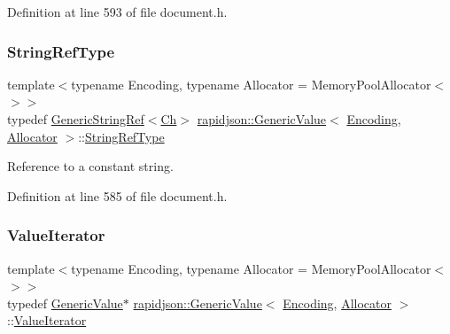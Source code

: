 Definition at line 593 of file document.\+h.

\mbox{\label{classrapidjson_1_1_generic_value_a559eb9cea54364a35518b02f6d74f379}} 
\subsubsection{\texorpdfstring{StringRefType}{StringRefType}}
{\footnotesize\ttfamily template$<$typename Encoding, typename Allocator = Memory\+Pool\+Allocator$<$$>$$>$ \\
typedef \mbox{\hyperlink{structrapidjson_1_1_generic_string_ref}{Generic\+String\+Ref}}$<$\mbox{\hyperlink{classrapidjson_1_1_generic_value_adcdbc7fa85a9a41b78966d7e0dcc2ac4}{Ch}}$>$ \mbox{\hyperlink{classrapidjson_1_1_generic_value}{rapidjson\+::\+Generic\+Value}}$<$ \mbox{\hyperlink{classrapidjson_1_1_encoding}{Encoding}}, \mbox{\hyperlink{classrapidjson_1_1_allocator}{Allocator}} $>$\+::\mbox{\hyperlink{classrapidjson_1_1_generic_value_a559eb9cea54364a35518b02f6d74f379}{String\+Ref\+Type}}}



Reference to a constant string. 



Definition at line 585 of file document.\+h.

\mbox{\label{classrapidjson_1_1_generic_value_a06ce0e14ec83b53c83e1b1699b53a25e}} 
\subsubsection{\texorpdfstring{ValueIterator}{ValueIterator}}
{\footnotesize\ttfamily template$<$typename Encoding, typename Allocator = Memory\+Pool\+Allocator$<$$>$$>$ \\
typedef \mbox{\hyperlink{classrapidjson_1_1_generic_value}{Generic\+Value}}$\ast$ \mbox{\hyperlink{classrapidjson_1_1_generic_value}{rapidjson\+::\+Generic\+Value}}$<$ \mbox{\hyperlink{classrapidjson_1_1_encoding}{Encoding}}, \mbox{\hyperlink{classrapidjson_1_1_allocator}{Allocator}} $>$\+::\mbox{\hyperlink{classrapidjson_1_1_generic_value_a06ce0e14ec83b53c83e1b1699b53a25e}{Value\+Iterator}}}



